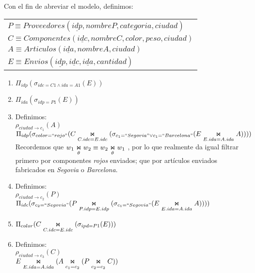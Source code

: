 Con el fin de abreviar el modelo, definimos:
	\begin{center}
		\begin{tabular}{l}
			$P \equiv Proveedores(\underline{idp}, nombreP, categoria, ciudad)$\\
			$C \equiv Componentes(\underline{idc}, nombreC, color, peso, ciudad)$\\
			$A \equiv Articulos(\underline{ida}, nombreA, ciudad)$\\
			$E \equiv Envios(\underline{idp}, \underline{idc}, \underline{ida}, cantidad)$\\
		\end{tabular}
	\end{center}
	\begin{enumerate}
		\item $\Pi_{idp}(\sigma_{idc = C1 \wedge ida = A1}(E))$ %
		\item $\Pi_{ida}(\sigma_{idp = P1}(E))$ %
		\item Definimos:\\ %
		$\rho_{ciudad\rightarrow c_1}(A)$\\
		$\Pi_{idp}(\sigma_{color=``rojo"}(C\innerjoin[C.idc = E.idc](\sigma_{c_1 = ``Segovia" \vee c_1 = ``Barcelona"}(E \innerjoin[E.ida = A.ida] A))))$\\[0.25cm]
		Recordemos que $w_1 \innerjoin w_2 \equiv w_2 \innerjoin w_1$ , por lo que realmente da igual filtrar primero por %
		componentes \textit{rojos} enviados; que por artículos enviados fabricados en \textit{Segovia} o \textit{Barcelona}.
		\item Definimos:\\ %
		$\rho_{ciudad\rightarrow c_2}(P)$\\
		$\Pi_{idc}(\sigma_{c_2 = ``Segovia"} (P \innerjoin[P.idp = E.idp] (\sigma_{c_1 = ``Segovia"} (E \innerjoin[E.ida = A.ida] A))))$
		\item $\Pi_{color}(C\innerjoin[C.idc = E.idc](\sigma_{ipd = P1}(E)))$ %
		\item Definimos:\\ %
		$\rho_{ciudad\rightarrow c_3}(C)$\\
		$E\innerjoin[E.ida = A.ida] (A\innerjoin[c_1 = c_2](P\innerjoin[c_2 = c_2]C))$\\
	\end{enumerate}